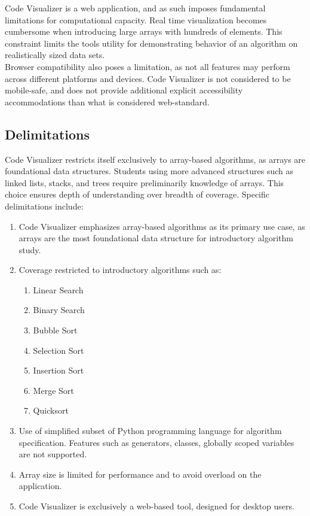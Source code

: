 \documentclass{IEEEtran}
\begin{document}
Code Visualizer is a web application, and as such imposes fundamental limitations for computational capacity. Real time visualization becomes cumbersome when introducing large arrays with hundreds of elements. This constraint limits the tools utility for demonstrating behavior of an algorithm on realistically sized data sets.
\\
Browser compatibility also poses a limitation, as not all features may perform across different platforms and devices. Code Visualizer is not considered to be mobile-safe, and does not provide additional explicit accessibility accommodations than what is considered web-standard.
\subsection{Delimitations}
Code Visualizer restricts itself exclusively to array-based algorithms, as arrays are foundational data structures. Students using more advanced structures such as linked lists, stacks, and trees require preliminarily knowledge of arrays. This choice ensures depth of understanding over breadth of coverage. Specific delimitations include:

\begin{enumerate}
    \item Code Visualizer emphasizes array-based algorithms as its primary use case, as arrays are the most foundational data structure for introductory algorithm study.
    \item Coverage restricted to introductory algorithms such as:
    \begin{enumerate}
        \item Linear Search
        \item Binary Search
        \item Bubble Sort
        \item Selection Sort
        \item Insertion Sort
        \item Merge Sort
        \item Quicksort
    \end{enumerate}
    \item Use of simplified subset of Python programming language for algorithm specification. Features such as generators, classes, globally scoped variables are not supported.
    \item Array size is limited for performance and to avoid overload on the application.
    \item Code Visualizer is exclusively a web-based tool, designed for desktop users.
\end{enumerate}
\end{document}
